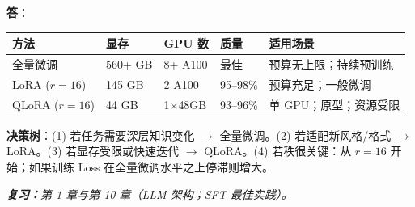 \begin{questionbox}
\textbf{答}：

{\small
\noindent\begin{tabularx}{\linewidth}{@{}l l l l Z{1}@{}}
\toprule
\textbf{方法} & \textbf{显存} & \textbf{GPU 数} & \textbf{质量} & \textbf{适用场景} \\
\midrule
全量微调 & 560+ GB & 8+ A100 & 最佳 & 预算无上限；持续预训练 \\
LoRA ($r=16$) & 145 GB & 2 A100 & 95--98\% & 预算充足；一般微调 \\
QLoRA ($r=16$) & 44 GB & 1$\times$48GB & 93--96\% & 单 GPU；原型；资源受限 \\
\bottomrule
\end{tabularx}
}

\textbf{决策树}：(1) 若任务需要深层知识变化 $\to$ 全量微调。(2) 若适配新风格/格式 $\to$ LoRA。(3) 若显存受限或快速迭代 $\to$ QLoRA。(4) 若秩很关键：从 $r=16$ 开始；如果训练 Loss 在全量微调水平之上停滞则增大。

\emph{\textbf{复习：}第 1 章与第 10 章（LLM 架构；SFT 最佳实践）。}
\end{questionbox}


